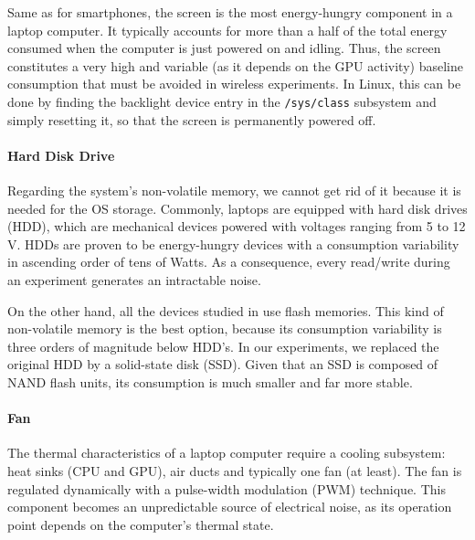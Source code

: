 \documentclass[twoside,nohyper]{tufte-book}
\theoremstyle{definition}
\theoremstyle{definition}
\theoremstyle{definition}
\theoremstyle{remark}
\begin{document}
Same as for
smartphones\cite[0pt]{Carroll2010},
the screen is the most energy-hungry component in a laptop computer. It
typically accounts for more than a half of the total energy consumed
when the computer is just powered on and idling. Thus, the screen
constitutes a very high and variable (as it depends on the GPU activity)
baseline consumption that must be avoided in wireless experiments. In
Linux, this can be done by finding the backlight device entry in the
\texttt{/sys/class} subsystem and simply resetting it, so that the
screen is permanently powered off.

\hypertarget{hard-disk-drive}{%
\paragraph{Hard Disk Drive}\label{hard-disk-drive}}

Regarding the system's non-volatile memory, we cannot get rid of it
because it is needed for the OS storage. Commonly, laptops are equipped
with hard disk drives (HDD), which are mechanical devices powered with
voltages ranging from 5 to 12 V. HDDs are proven to be energy-hungry
devices\cite[-1cm]{Hylick2008}
with a consumption variability in ascending order of tens of Watts. As a
consequence, every read/write during an experiment generates an
intractable noise.

On the other hand, all the devices studied in \citet{Serrano2014} use
flash memories. This kind of non-volatile memory is the best option,
because its consumption variability is three orders of magnitude below
HDD's\cite[0pt]{Grupp2009}.
In our experiments, we replaced the original HDD by a solid-state disk
(SSD). Given that an SSD is composed of NAND flash units, its
consumption is much smaller and far more stable.

\hypertarget{fan}{%
\paragraph{Fan}\label{fan}}

The thermal characteristics of a laptop computer require a cooling
subsystem: heat sinks (CPU and GPU), air ducts and typically one fan (at
least). The fan is regulated dynamically with a pulse-width modulation
(PWM) technique. This component becomes an unpredictable source of
electrical noise, as its operation point depends on the computer's
thermal state.
\end{document}
